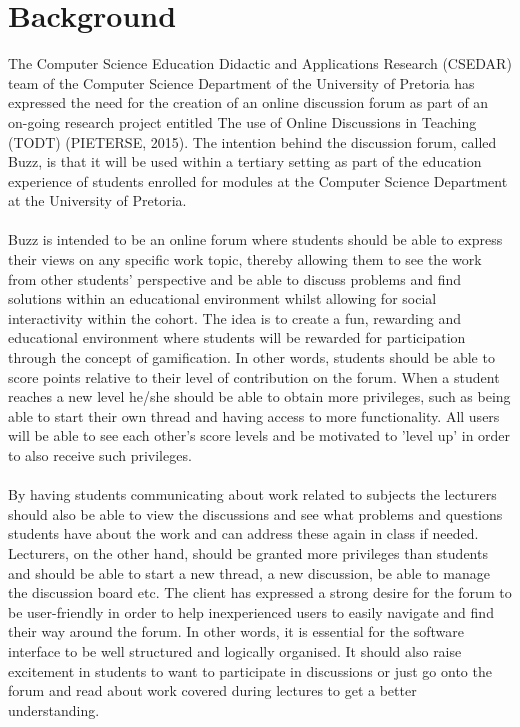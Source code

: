 \documentclass[a4paper]{article}
\begin{document}
\section{Background}
The Computer Science Education Didactic and Applications Research (CSEDAR) team of the Computer Science Department of the University of Pretoria has expressed the need for the creation of an online discussion forum as part of an on-going research project entitled The use of Online Discussions in Teaching (TODT) (PIETERSE, 2015). The intention behind the discussion forum, called Buzz, is that it will be used within a tertiary setting as part of the education experience of students enrolled for modules at the Computer Science Department at the University of Pretoria. 
\\
\\Buzz is intended to be an online forum where students should be able to express their views on any specific work topic, thereby allowing them to see the work from other students’ perspective and be able to discuss problems and find solutions within an educational environment whilst allowing for social interactivity within the cohort. The idea is to create a fun, rewarding and educational environment where students will be rewarded for participation through the concept of gamification. In other words, students should be able to score points relative to their level of contribution on the forum. When a student reaches a new level he/she should be able to obtain more privileges, such as being able to start their own thread and having access to more functionality. All users will be able to see each other's score levels and be motivated to 'level up' in order to also receive such privileges.
\\
\\By having students communicating about work related to subjects the lecturers should also be able to view the discussions and see what problems and questions students have about the work and can address these again in class if needed. Lecturers, on the other hand, should be granted  more privileges than students and should be able to start a new thread, a new discussion, be able to manage the discussion board etc. The client has expressed a strong desire for the forum to be user-friendly in order to help inexperienced users to easily navigate and find their way around the forum. In other words, it is essential for the software interface to be well structured and logically organised. It should also raise excitement in students to want to participate in discussions or just go onto the forum and read about work covered during lectures to get a better understanding.
\end{document}
